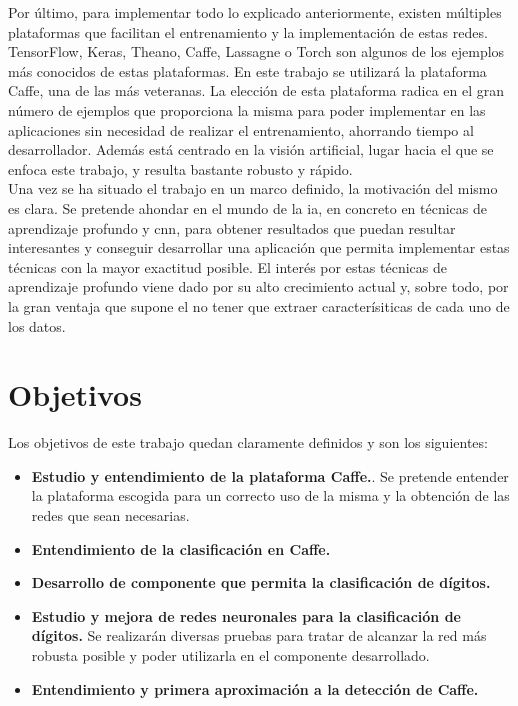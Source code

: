 Por último, para implementar todo lo explicado anteriormente, existen múltiples plataformas que facilitan el entrenamiento y la implementación de estas redes. TensorFlow, Keras, Theano, Caffe, Lassagne o Torch son algunos de los ejemplos más conocidos de estas plataformas. En este trabajo se utilizará la plataforma Caffe, una de las más veteranas. La elección de esta plataforma radica en el gran número de ejemplos que proporciona la misma para poder implementar en las aplicaciones sin necesidad de realizar el entrenamiento, ahorrando tiempo al desarrollador. Además está centrado en la visión artificial, lugar hacia el que se enfoca este trabajo, y resulta bastante robusto y rápido.\\

Una vez se ha situado el trabajo en un marco definido, la motivación del mismo es clara. Se pretende ahondar en el mundo de la \acrshort{ia}, en concreto en técnicas de aprendizaje profundo y \acrshort{cnn}, para obtener resultados que puedan resultar interesantes y conseguir desarrollar una aplicación que permita implementar estas técnicas con la mayor exactitud posible. El interés por estas técnicas de aprendizaje profundo viene dado por su alto crecimiento actual y, sobre todo, por la gran ventaja que supone el no tener que extraer caracterísiticas de cada uno de los datos.

\section{Objetivos}
Los objetivos de este trabajo quedan claramente definidos y son los siguientes:
\begin{itemize}
	\item \textbf{Estudio y entendimiento de la plataforma Caffe.}. Se pretende entender la plataforma escogida para un correcto uso de la misma y la obtención de las redes que sean necesarias.
	\item \textbf{Entendimiento de la clasificación en Caffe.}
	\item \textbf{Desarrollo de componente que permita la clasificación de dígitos.}
	\item \textbf{Estudio y mejora de redes neuronales para la clasificación de dígitos.} Se realizarán diversas pruebas para tratar de alcanzar la red más robusta posible y poder utilizarla en el componente desarrollado.
	\item \textbf{Entendimiento y primera aproximación a la detección de Caffe.}
\end{itemize}

